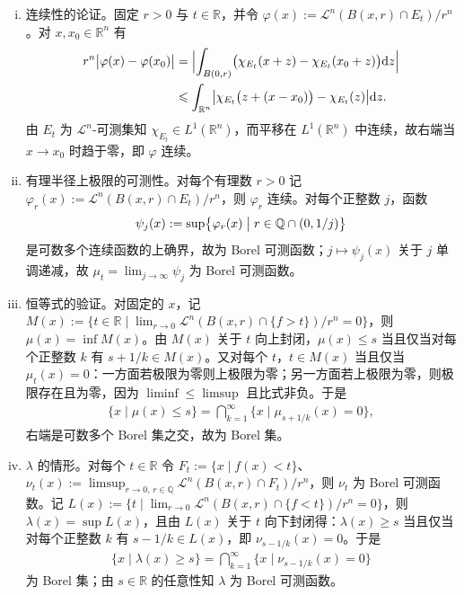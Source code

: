\documentclass[../../main.tex]{subfiles}%
\begin{document}
\begin{remark}\label{remark:ch05-lem-5-6-论证}
\begin{enumerate}[(i)]
\item 连续性的论证。固定 $r>0$ 与 $t\in\mathbb{R}$，并令 $\varphi(x):=\mathcal{L}^n(B(x,r)\cap E_t)/r^n$。对 $x,x_0\in\mathbb{R}^n$ 有
\begin{align*}
r^n\bigl\lvert\varphi(x)-\varphi(x_0)\bigr\rvert
&=\Bigl\lvert\int_{B(0,r)}\bigl(\chi_{E_t}(x+z)-\chi_{E_t}(x_0+z)\bigr)\mathrm{d} z\Bigr\rvert\\
&\leqslant\int_{\mathbb{R}^n}\bigl\lvert\chi_{E_t}\bigl(z+(x-x_0)\bigr)-\chi_{E_t}(z)\bigr\rvert\mathrm{d} z .
\end{align*}
由 $E_t$ 为 $\mathcal{L}^n$-可测集知 $\chi_{E_t}\in L^1(\mathbb{R}^n)$，而平移在 $L^1(\mathbb{R}^n)$ 中连续，故右端当 $x\to x_0$ 时趋于零，即 $\varphi$ 连续。
\item 有理半径上极限的可测性。对每个有理数 $r>0$ 记 $\varphi_r(x):=\mathcal{L}^n(B(x,r)\cap E_t)/r^n$，则 $\varphi_r$ 连续。对每个正整数 $j$，函数
\begin{align*}
\psi_j(x):=\sup\bigl\{\varphi_r(x)\bigm|r\in\mathbb{Q}\cap(0,1/j)\bigr\}
\end{align*}
是可数多个连续函数的上确界，故为 Borel 可测函数；$j\mapsto\psi_j(x)$ 关于 $j$ 单调递减，故 $\mu_t=\lim_{j\to\infty}\psi_j$ 为 Borel 可测函数。
\item 恒等式的验证。对固定的 $x$，记 $M(x):=\{t\in\mathbb{R}\mid\lim_{r\to0}\mathcal{L}^n(B(x,r)\cap\{f>t\})/r^n=0\}$，则 $\mu(x)=\inf M(x)$。由 $M(x)$ 关于 $t$ 向上封闭，$\mu(x)\leqslant s$ 当且仅当对每个正整数 $k$ 有 $s+1/k\in M(x)$。又对每个 $t$，$t\in M(x)$ 当且仅当 $\mu_t(x)=0$：一方面若极限为零则上极限为零；另一方面若上极限为零，则极限存在且为零，因为 $\liminf\leqslant\limsup$ 且比式非负。于是
\begin{align*}
\{x\mid\mu(x)\leqslant s\}=\bigcap_{k=1}^{\infty}\{x\mid\mu_{s+1/k}(x)=0\},
\end{align*}
右端是可数多个 Borel 集之交，故为 Borel 集。
\item $\lambda$ 的情形。对每个 $t\in\mathbb{R}$ 令 $F_t:=\{x\mid f(x)<t\}$、$\nu_t(x):=\limsup_{r\to0,\,r\in\mathbb{Q}}\mathcal{L}^n(B(x,r)\cap F_t)/r^n$，则 $\nu_t$ 为 Borel 可测函数。记 $L(x):=\{t\mid\lim_{r\to0}\mathcal{L}^n(B(x,r)\cap\{f<t\})/r^n=0\}$，则 $\lambda(x)=\sup L(x)$，且由 $L(x)$ 关于 $t$ 向下封闭得：$\lambda(x)\geqslant s$ 当且仅当对每个正整数 $k$ 有 $s-1/k\in L(x)$，即 $\nu_{s-1/k}(x)=0$。于是
\begin{align*}
\{x\mid\lambda(x)\geqslant s\}=\bigcap_{k=1}^{\infty}\{x\mid\nu_{s-1/k}(x)=0\}
\end{align*}
为 Borel 集；由 $s\in\mathbb{R}$ 的任意性知 $\lambda$ 为 Borel 可测函数。
\end{enumerate}
\end{remark}
\end{document}
